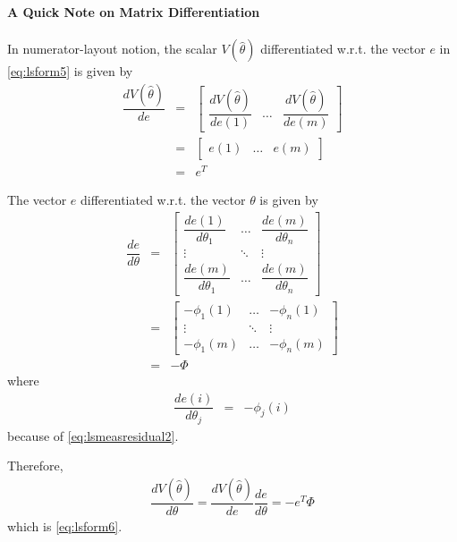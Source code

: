 \begin{mdframed}
\textbf{A Quick Note on Matrix Differentiation}
\\
\\
In numerator-layout notion, the scalar $V(\hat{\theta})$ differentiated w.r.t. the vector $e$ in \eqref{eq:lsform5} is given by
\begin{eqnarray}
	\dfrac{dV(\hat{\theta})}{de} &=& \left[\begin{array}{ccc}
		\dfrac{dV(\hat{\theta})}{de(1)} & \ldots & \dfrac{dV(\hat{\theta})}{de(m)}
	\end{array}\right] \nonumber \\
	&=& \left[\begin{array}{ccc}
		e(1) & \ldots & e(m)
	\end{array}\right] \nonumber \\
&=& e^T \nonumber
\end{eqnarray}

The vector $e$ differentiated w.r.t. the vector $\theta$ is given by
\begin{eqnarray}
\dfrac{de}{d\theta} &=& \left[\begin{array}{ccc}
                                \dfrac{de(1)}{d\theta_1} & \ldots & \dfrac{de(m)}{d\theta_n} \\
                                \vdots & \ddots & \vdots \\
                                \dfrac{de(m)}{d\theta_1} & \ldots & \dfrac{de(m)}{d\theta_n}
                              \end{array}\right] \nonumber \\
                              &=& \left[\begin{array}{ccc}
                                -\phi_1(1) & \ldots & -\phi_n(1) \\
                                \vdots & \ddots & \vdots \\
                                -\phi_1(m) & \ldots & -\phi_n(m)
                              \end{array}\right] \nonumber \\
                              &=& -\Phi \nonumber
\end{eqnarray}
where
\begin{eqnarray}
\dfrac{de(i)}{d\theta_j} &=& -\phi_j(i) \nonumber
\end{eqnarray}
because of \eqref{eq:lsmeasresidual2}.

Therefore,
\begin{eqnarray}
  \dfrac{dV(\hat{\theta})}{d\theta} = \dfrac{dV(\hat{\theta})}{de}\dfrac{de}{d\theta} = -e^T\Phi \nonumber
\end{eqnarray}
which is \eqref{eq:lsform6}.
\end{mdframed}

